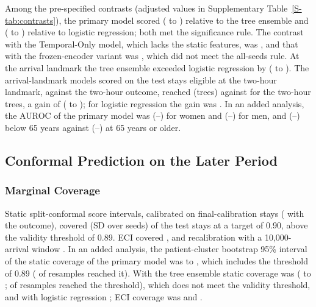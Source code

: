 Among the pre-specified contrasts (adjusted values in Supplementary Table~\ref{S-tab:contrasts}), the primary model scored \RVCOneDelta{} (\RVCOneLo{} to \RVCOneHi{}) relative to
the tree ensemble and \RVCTwoDelta{} (\RVCTwoLo{} to \RVCTwoHi{}) relative to logistic regression; both met the significance rule. The contrast with the Temporal-Only
model, which lacks the static features, was \RVCThreeDelta{}, and that with the frozen-encoder variant was \RVCFourDelta{}, which did not meet the all-seeds rule. At the arrival landmark the tree ensemble exceeded logistic regression by \RVCFiveDelta{}
(\RVCFiveLo{} to \RVCFiveHi{}). The arrival-landmark models scored on the \RVCommonN{} test stays eligible at the two-hour landmark, against the two-hour outcome, reached \RVCommonArrTrees{} (trees) against \RVCommonTwoTrees{} for the two-hour trees, a gain of \RVCommonTreesGain{} (\RVCommonTreesGainLo{} to \RVCommonTreesGainHi{}); for logistic regression the gain was \RVCommonLrGain{}. In an added analysis, the AUROC of the primary model was \RVSubFemaleAuroc{} (\RVSubFemaleLo{}--\RVSubFemaleHi{}) for women and \RVSubMaleAuroc{} (\RVSubMaleLo{}--\RVSubMaleHi{}) for men, and \RVSubAgeUnderAuroc{} (\RVSubAgeUnderLo{}--\RVSubAgeUnderHi{}) below 65 years against \RVSubAgeOverAuroc{} (\RVSubAgeOverLo{}--\RVSubAgeOverHi{}) at 65 years or older.



\subsection{Conformal Prediction on the Later Period}
\label{sec:results-coverage}

\subsubsection{Marginal Coverage}
Static split-conformal score intervals, calibrated on \RVNFc{} final-calibration stays (\RVPosFc{} with the outcome), covered \RVIntCovStatic{} (SD \RVIntCovSdStatic{}
over seeds) of the \RVNTest{} test stays at a target of 0.90, above the validity threshold of 0.89.
ECI covered \RVIntCovEci{}, and recalibration with a 10{,}000-arrival window \RVIntCovRecalTen{}. In an added analysis, the patient-cluster bootstrap 95\% interval of the static coverage of the primary model was \RVStaticBootHybLo{} to \RVStaticBootHybHi{}, which includes the threshold of 0.89 (\RVStaticBootHybShare{} of resamples reached it). With the tree ensemble static coverage was \RVOtherXgbStaticCov{} (\RVStaticBootXgbLo{} to \RVStaticBootXgbHi{}; \RVStaticBootXgbShare{} of resamples reached the threshold), which does not meet the validity threshold, and with logistic regression \RVOtherLrStaticCov{}; ECI coverage was \RVOtherXgbEciCov{} and \RVOtherLrEciCov{}.

